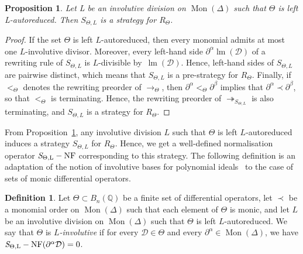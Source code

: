 \documentclass[11pt]{article}
\newtheorem{proposition}[theorem]{Proposition}
\theoremstyle{definition}
\newtheorem{definition}[theorem]{Definition}
\newcommand\D{\mathcal{D}}
\DeclareMathOperator{\lm}{lm}
\newcommand\Q{\mathbb{Q}}
\newcommand\Weyl[1]{B_{#1}(\Q)}
\newcommand\monBasis{\Mon(\Delta)}
\DeclareMathOperator{\Mon}{Mon}
\newcommand\rewTheta{\to_\Theta}
\newcommand\RTheta{R_{\Theta}}
\newcommand\SThetaL{S_{\Theta,L}}
\DeclareMathOperator{\SThetaLNF}{{\it S}_{\Theta,L}-NF}
\begin{document}
\begin{proposition}\label{prop:involutive_strategy}
  Let L be an involutive division on $\Mon(\Delta)$ such that $\Theta$ is
  left L-autoreduced. Then $\SThetaL$ is a strategy for $\RTheta$.  
\end{proposition}

\begin{proof}
  If the set $\Theta$ is left $L$-autoreduced, then every monomial admits
  at most one $L$-involutive divisor. Moreover, every left-hand side
  $\partial^\alpha\lm(\D)$ of a rewriting rule of $\SThetaL$ is
  $L$-divisible by~$\lm(\D)$. Hence, left-hand sides of $\SThetaL$ are
  pairwise distinct, which means that $\SThetaL$ is a pre-strategy for
  $\RTheta$. Finally, if $<_\Theta$ denotes the rewriting preorder of
  $\rewTheta$, then $\partial^\alpha<_\Theta\partial^\beta$ implies that
  $\partial^\alpha\prec\partial^\beta$, so that $<_\Theta$ is
  terminating. Hence, the rewriting preorder of $\twoheadrightarrow_{\SThetaL}$ is also
  terminating, and $\SThetaL$ is a strategy for $\RTheta$.
\end{proof}
\smallskip


From Proposition~\ref{prop:involutive_strategy}, any involutive division
$L$ such that $\Theta$ is left $L$-autoreduced induces a strategy
$\SThetaL$ for $\RTheta$. Hence, we get a well-defined normalisation
operator $\SThetaLNF$ corresponding to this strategy. The following
definition is an adaptation of the notion of involutive bases for
polynomial ideals~\cite{MR1627129} to the case of sets of monic
differential operators.
\smallskip

\begin{definition}
  Let $\Theta\subset\Weyl{n}$ be a finite set of differential operators,
  let $\prec$ be a monomial order on $\monBasis$ such that each element
  of $\Theta$ is monic, and let $L$ be an involutive division on
  $\Mon(\Delta)$ such that $\Theta$ is left $L$-autoreduced. We say that
  $\Theta$ is {\em $L$-involutive} if for every $\D\in\Theta$ and every
  $\partial^\alpha\in\Mon(\Delta)$, we have
  $\SThetaLNF(\partial^\alpha\D)=0$. 
\end{definition}
\smallskip
\end{document}
